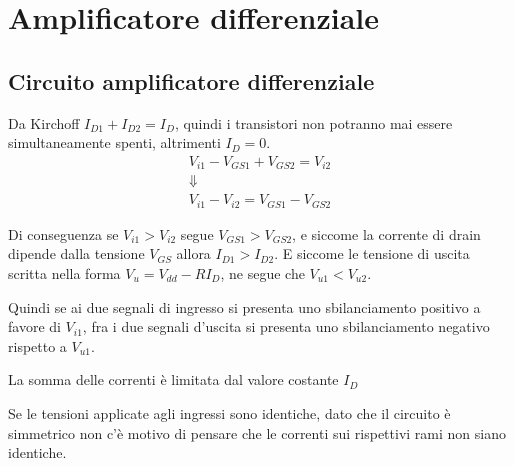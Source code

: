 \documentclass[../template]{subfiles}
\begin{document}
\section{Amplificatore differenziale}
\subsection{Circuito amplificatore differenziale}
\begin{center}
\end{center}
\label{circuito:amplificatore_differenziale}


Da Kirchoff $I_{D1} + I_{D2} = I_D$, quindi i transistori non potranno mai essere simultaneamente spenti, altrimenti $I_D = 0$.
\begin{gather*}
    V_{i1} - V_{GS1} + V_{GS2} = V_{i2}\\
    \Downarrow\\
    V_{i1} - V_{i2} =  V_{GS1} - V_{GS2}
\end{gather*}

Di conseguenza se $V_{i1} > V_{i2}$ segue $V_{GS1} > V_{GS2}$, e siccome la corrente di drain dipende dalla tensione $V_{GS}$
allora $I_{D1} > I_{D2}$.
E siccome le tensione di uscita scritta nella forma $V_u = V_{dd} - R I_D$, ne segue che $V_{u1} < V_{u2}$.

Quindi se ai due segnali di ingresso si presenta uno sbilanciamento positivo a favore di $V_{i1}$, fra i due segnali d'uscita
si presenta uno sbilanciamento negativo rispetto a $V_{u1}$.

La somma delle correnti è limitata dal valore costante $I_D$

Se le tensioni applicate agli ingressi sono identiche, dato che il circuito è simmetrico non c'è motivo di pensare che
le correnti sui rispettivi rami non siano identiche.
\end{document}
